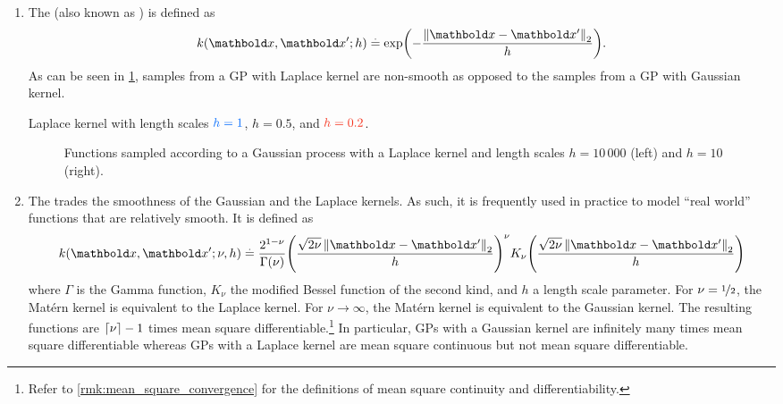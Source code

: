 \begin{enumerate}
  \begin{marginfigure}
    \caption{Gaussian kernel with length scales $\b{h=1}$, $h=0.5$, and $\r{h=0.2}$.}
  \end{marginfigure}

  \item The  (also known as ) is defined as \begin{align}
    k(\vx, \vxp; h) \defeq \exp\parentheses*{-\frac{\norm{\vx-\vxp}_2}{h}}. \label{eq:laplace_kernel}
  \end{align}
  As can be seen in \cref{fig:gp_samples_laplace}, samples from a GP with Laplace kernel are non-smooth as opposed to the samples from a GP with Gaussian kernel.

  \begin{marginfigure}[10\baselineskip]
    \caption{Laplace kernel with length scales $\b{h=1}$, $h=0.5$, and $\r{h=0.2}$.}
  \end{marginfigure}

  \begin{figure}
    \caption{Functions sampled according to a Gaussian process with a Laplace kernel and length scales $h = 10\,000$ (left) and $h = 10$ (right).}\label{fig:gp_samples_laplace}
  \end{figure}

  \item The  trades the smoothness of the Gaussian and the Laplace kernels.
  As such, it is frequently used in practice to model ``real world'' functions that are relatively smooth.
  It is defined as \begin{align}
    k(\vx, \vxp; \nu, h) \defeq \frac{2^{1-\nu}}{\Gamma(\nu)} \parentheses*{\frac{\sqrt{2 \nu} \norm{\vx-\vxp}_2}{h}}^\nu K_\nu \parentheses*{\frac{\sqrt{2 \nu} \norm{\vx-\vxp}_2}{h}}
  \end{align} where $\Gamma$ is the Gamma function, $K_\nu$ the modified Bessel function of the second kind, and $h$ a length scale parameter.
  For ${\nu = \nicefrac{1}{2}}$, the Matérn kernel is equivalent to the Laplace kernel.
  For ${\nu \to \infty}$, the Matérn kernel is equivalent to the Gaussian kernel.
  The resulting functions are $\left\lceil \nu \right\rceil - 1$ times mean square differentiable.\footnote{Refer to \cref{rmk:mean_square_convergence} for the definitions of mean square continuity and differentiability.}
  In particular, GPs with a Gaussian kernel are infinitely many times mean square differentiable whereas GPs with a Laplace kernel are mean square continuous but not mean square differentiable.
\end{enumerate}

